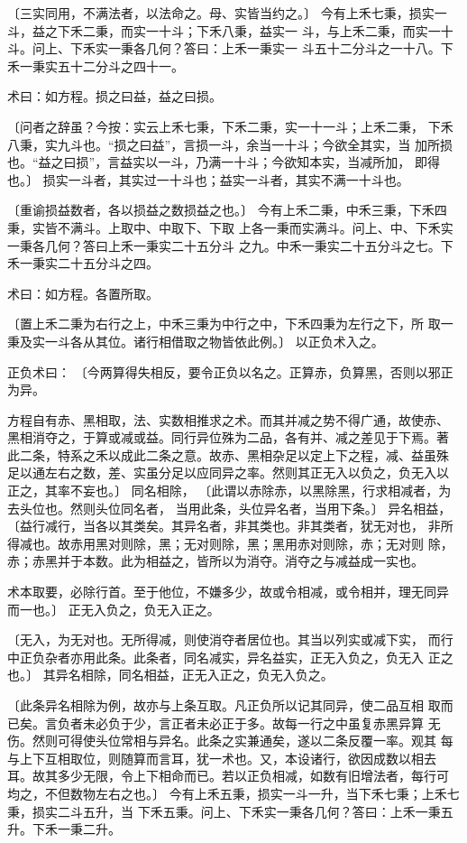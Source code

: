\documentclass[a4paper,12pt,UTF8,twoside]{ctexbook}
\begin{document}
〔三实同用，不满法者，以法命之。母、实皆当约之。〕 今有上禾七秉，损实一斗，益之下禾二秉，而实一十斗；下禾八秉，益实一 斗，与上禾二秉，而实一十斗。问上、下禾实一秉各几何？答曰：上禾一秉实一 斗五十二分斗之一十八。下禾一秉实五十二分斗之四十一。

术曰：如方程。损之曰益，益之曰损。

〔问者之辞虽？今按：实云上禾七秉，下禾二秉，实一十一斗；上禾二秉， 下禾八秉，实九斗也。“损之曰益”，言损一斗，余当一十斗；今欲全其实，当 加所损也。“益之曰损”，言益实以一斗，乃满一十斗；今欲知本实，当减所加， 即得也。〕 损实一斗者，其实过一十斗也；益实一斗者，其实不满一十斗也。

〔重谕损益数者，各以损益之数损益之也。〕 今有上禾二秉，中禾三秉，下禾四秉，实皆不满斗。上取中、中取下、下取 上各一秉而实满斗。问上、中、下禾实一秉各几何？答曰上禾一秉实二十五分斗 之九。中禾一秉实二十五分斗之七。下禾一秉实二十五分斗之四。

术曰：如方程。各置所取。

〔置上禾二秉为右行之上，中禾三秉为中行之中，下禾四秉为左行之下，所 取一秉及实一斗各从其位。诸行相借取之物皆依此例。〕 以正负术入之。

正负术曰： 〔今两算得失相反，要令正负以名之。正算赤，负算黑，否则以邪正为异。

方程自有赤、黑相取，法、实数相推求之术。而其并减之势不得广通，故使赤、 黑相消夺之，于算或减或益。同行异位殊为二品，各有并、减之差见于下焉。著 此二条，特系之禾以成此二条之意。故赤、黑相杂足以定上下之程，减、益虽殊 足以通左右之数，差、实虽分足以应同异之率。然则其正无入以负之，负无入以 正之，其率不妄也。〕 同名相除， 〔此谓以赤除赤，以黑除黑，行求相减者，为去头位也。然则头位同名者， 当用此条，头位异名者，当用下条。〕 异名相益， 〔益行减行，当各以其类矣。其异名者，非其类也。非其类者，犹无对也， 非所得减也。故赤用黑对则除，黑；无对则除，黑；黑用赤对则除，赤；无对则 除，赤；赤黑并于本数。此为相益之，皆所以为消夺。消夺之与减益成一实也。

术本取要，必除行首。至于他位，不嫌多少，故或令相减，或令相并，理无同异 而一也。〕 正无入负之，负无入正之。

〔无入，为无对也。无所得减，则使消夺者居位也。其当以列实或减下实， 而行中正负杂者亦用此条。此条者，同名减实，异名益实，正无入负之，负无入 正之也。〕 其异名相除，同名相益，正无入正之，负无入负之。

〔此条异名相除为例，故亦与上条互取。凡正负所以记其同异，使二品互相 取而已矣。言负者未必负于少，言正者未必正于多。故每一行之中虽复赤黑异算 无伤。然则可得使头位常相与异名。此条之实兼通矣，遂以二条反覆一率。观其 每与上下互相取位，则随算而言耳，犹一术也。又，本设诸行，欲因成数以相去 耳。故其多少无限，令上下相命而已。若以正负相减，如数有旧增法者，每行可 均之，不但数物左右之也。〕 今有上禾五秉，损实一斗一升，当下禾七秉；上禾七秉，损实二斗五升，当 下禾五秉。问上、下禾实一秉各几何？答曰：上禾一秉五升。下禾一秉二升。
\end{document}
